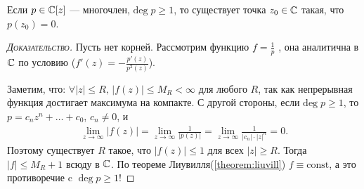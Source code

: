 \documentclass[../complex-analysis.tex]{subfiles}
\begin{document}
\begin{thm}
 Если $ p \in \mathbb{C}[z] $ --- многочлен, $ \mathrm{deg}\;p \geqslant 1 $, то существует точка $ z_0 \in \mathbb{C} $ такая, что $ p(z_0) = 0 $.
\end{thm}
\begin{proof}[\normalfont\textsc{Доказательство}]
 Пусть нет корней. Рассмотрим функцию $ f = \frac{1}{p} $ , она аналитична в $ \mathbb{C} $  по условию ($ f'(z) = -\frac{p'(z)}{p^{2}(z)} $).

 Заметим, что: $ \forall \left| z \right| \leqslant R,\, \left| f(z) \right| \leqslant M_R < \infty $ для любого $ R $, так как непрерывная
 функция достигает максимума на компакте.
 С другой стороны, если $ \mathrm{deg}\;p \geqslant 1 $, то $ p = c_n z^{n} + \ldots + c_0 $, $ c_n \neq 0 $, и 
 \begin{align*}
  \lim_{z \to \infty} \left| f(z) \right| = \lim_{z \to \infty} \frac{1}{\left| p(z) \right|} = \lim_{z \to \infty} \frac{1}{\left| c_n \right| \cdot \left| z \right|^{n}} = 0.
 \end{align*} Поэтому существует $ R $ такое, что $ \left| f(z) \right| \leqslant 1 $ для всех $ \left| z \right| \geqslant R $. Тогда $ \left| f \right| \leqslant M_R + 1 $ всюду в $ \mathbb{C} $. По теореме Лиувилля(\ref{theorem:liuvill}) $ f \equiv \mathrm{const} $, а это противоречие c $ \deg p \geqslant 1 $!
\end{proof}
\end{document}
